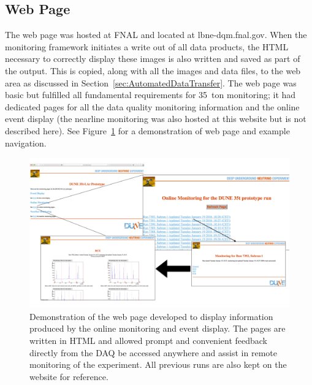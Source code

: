 \subsection{Web Page}\label{sec:WebPage}

The web page was hosted at FNAL and located at lbne-dqm.fnal.gov.  When the monitoring framework initiates a write out of all data products, the HTML necessary to correctly display these images is also written and saved as part of the output.  This is copied, along with all the images and data files, to the web area as discussed in Section~\ref{sec:AutomatedDataTransfer}.  The web page was basic but fulfilled all fundamental requirements for 35~ton monitoring; it had dedicated pages for all the data quality monitoring information and the online event display (the nearline monitoring was also hosted at this website but is not described here).  See Figure~\ref{fig:WebPage} for a demonstration of web page and example navigation.

\begin{figure}
  \centering
  \includegraphics[width=14cm]{webPage.png}
  \caption[Web page for online monitoring and event displays]{Demonstration of the web page developed to display information produced by the online monitoring and event display.  The pages are written in HTML and allowed prompt and convenient feedback directly from the DAQ be accessed anywhere and assist in remote monitoring of the experiment.  All previous runs are also kept on the website for reference.}
  \label{fig:WebPage}
\end{figure}

